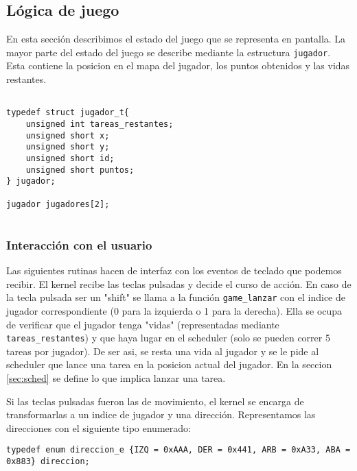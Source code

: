 \vspace{10pt}
\subsection{Lógica de juego}

\label{sec:game}

En esta sección describimos el estado del juego que se representa en pantalla.
La mayor parte del estado del juego se describe mediante la estructura \verb|jugador|. Esta contiene la posicion en el mapa del jugador, los puntos obtenidos y las vidas restantes.



\begin{verbatim}

typedef struct jugador_t{
    unsigned int tareas_restantes;
    unsigned short x;
    unsigned short y;
    unsigned short id;
    unsigned short puntos;
} jugador;

jugador jugadores[2];


\end{verbatim}


\subsubsection{Interacción con el usuario}


Las siguientes rutinas hacen de interfaz con los eventos de teclado que podemos recibir. El kernel recibe las teclas pulsadas y decide el curso de acción. 
En caso de la tecla pulsada ser un "shift" se llama a la función \verb|game_lanzar| con el indice de jugador correspondiente (0 para la izquierda o 1 para la derecha). Ella se ocupa de verificar que el jugador tenga "vidas" (representadas mediante \verb|tareas_restantes|) y que haya lugar en el scheduler (solo se pueden correr 5 tareas por jugador). De ser asi, se resta una vida al jugador y se le pide al scheduler que lance una tarea en la posicion actual del jugador. En la seccion \ref{sec:sched} se define lo que implica lanzar una tarea. 

Si las teclas pulsadas fueron las de movimiento, el kernel se encarga de transformarlas a un indice de jugador y una dirección. Representamos las direcciones con el siguiente tipo enumerado:

\begin{verbatim}
typedef enum direccion_e {IZQ = 0xAAA, DER = 0x441, ARB = 0xA33, ABA = 0x883} direccion;
\end{verbatim}

